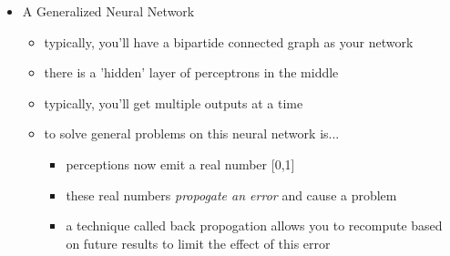 \documentclass[12pt]{article}
\begin{document}
\begin{itemize}
\begin{itemize}
		\end{itemize}
		\item A Generalized Neural Network 
		\begin{itemize}
			\item typically, you'll have a bipartide connected graph as your network 
			\item there is a 'hidden' layer of perceptrons in the middle 
			\item typically, you'll get multiple outputs at a time
			\item to solve general problems on this neural network is... 
			\begin{itemize}
				\item perceptions now emit a real number [0,1]
				\item these real numbers \emph{propogate an error} and cause a problem 
				\item a technique called back propogation allows you to recompute based on future results to limit the effect of this error 
			\end{itemize}
		\end{itemize}
	\end{itemize}
	\clearpage
\end{document}

